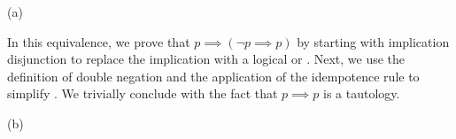 \documentclass[a4paper,10pt,fleqn]{article}
\begin{document}
\noindent\hspace*{\parindent}(a) \begin{center}
\end{center}
\bigskip


\bigskip

\setlength{\leftskip}{\dimexpr\parindent+2em\relax}
\noindent In this equivalence, we prove that $p \implies (\lnot p \implies p)$ by starting with implication disjunction to replace the implication with a logical or \citep[page 17]{simpson-notes}. Next, we use the definition of double negation \citep[Slide 25]{simpson25a} and the application of the idempotence rule to simplify \citep[Slide 26]{simpson25a}. We trivially conclude with the fact that $p \implies p$ is a tautology. 

\bigskip

\newpage

\setlength{\leftskip}{0pt}
\medskip

\noindent\hspace*{\parindent}(b) \begin{center}
\end{center}
\bigskip


\bigskip
\end{document}
